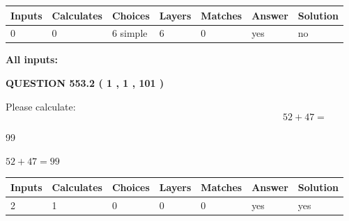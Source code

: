 \documentclass[12pt]{article}
\begin{document}
   
\noindent\begin{tabular}{|l|l|l|l|l|l|l|}
 \hline
Inputs & Calculates & Choices & Layers & Matches & Answer & Solution \\ \hline
 0  & 
 0  & 
 6
  simple  
  & 
 6  & 
 0  & 
  yes & 
  no 
  \\ \hline
 \end{tabular}
   
   
   
   
\noindent{}
   
   
   
   
\noindent\vspace{0.1in}\hspace{-0.08in} {\textbf{\Large{All inputs: }}}
   
   
  
\vspace{0.2in}
  
{\textbf{\Large{QUESTION
553.2 
 ( 1 , 1 , 101 )
}}}
  
  
 
Please calculate:
\begin{equation}
52 +  %
47 = \nonumber
\end{equation}
 
 
 
\noindent{}
 
 

99
 
 
\noindent{}
 
 

 
 
 
\noindent{}
 
 

$ %
52 +  %
47=   %
99$
 
 
\noindent{}
 
 

 
   
   
   
   
\noindent\begin{tabular}{|l|l|l|l|l|l|l|}
 \hline
Inputs & Calculates & Choices & Layers & Matches & Answer & Solution \\ \hline
 2  & 
 1  & 
 0
  & 
 0  & 
 0  & 
  yes & 
  yes 
  \\ \hline
 \end{tabular}
   
\end{document}
